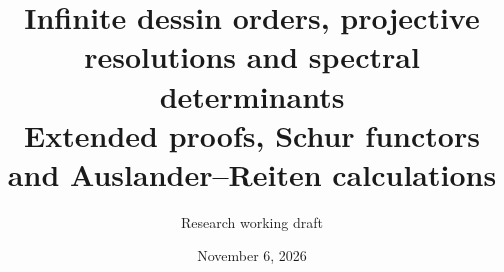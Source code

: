 
\usepackage{tikz-cd}
\usepackage{graphicx}
\newtheorem{corollary}[theorem]{Corollary}
\newcommand{\gshift}[2]{#1\langle #2\rangle}
\date{November 6, 2026}
\title{Infinite dessin orders, projective resolutions and spectral determinants\\\large Extended proofs, Schur functors and Auslander--Reiten calculations}
\author{Research working draft}
\makeatletter
\renewcommand*\l@section{\@dottedtocline{1}{0em}{2.4em}}
\renewcommand*\l@subsection{\@dottedtocline{2}{2.4em}{3.2em}}
\renewcommand*\l@subsubsection{\@dottedtocline{3}{5.6em}{4em}}
\makeatother

\maketitle
